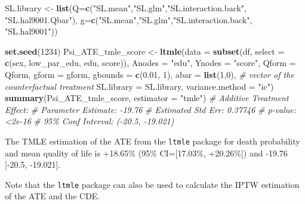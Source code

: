 \documentclass[
]{book}
\newenvironment{Shaded}{\begin{snugshade}}{\end{snugshade}}
\newcommand{\AttributeTok}[1]{\textcolor[rgb]{0.13,0.29,0.53}{#1}}
\newcommand{\CommentTok}[1]{\textcolor[rgb]{0.56,0.35,0.01}{\textit{#1}}}
\newcommand{\DecValTok}[1]{\textcolor[rgb]{0.00,0.00,0.81}{#1}}
\newcommand{\FloatTok}[1]{\textcolor[rgb]{0.00,0.00,0.81}{#1}}
\newcommand{\FunctionTok}[1]{\textcolor[rgb]{0.13,0.29,0.53}{\textbf{#1}}}
\newcommand{\NormalTok}[1]{#1}
\newcommand{\OtherTok}[1]{\textcolor[rgb]{0.56,0.35,0.01}{#1}}
\newcommand{\StringTok}[1]{\textcolor[rgb]{0.31,0.60,0.02}{#1}}
\begin{document}
\begin{Shaded}
\begin{Highlighting}[]
\NormalTok{SL.library }\OtherTok{\textless{}{-}} \FunctionTok{list}\NormalTok{(}\AttributeTok{Q=}\FunctionTok{c}\NormalTok{(}\StringTok{"SL.mean"}\NormalTok{,}\StringTok{"SL.glm"}\NormalTok{,}\StringTok{"SL.interaction.back"}\NormalTok{, }\StringTok{"SL.hal9001.Qbar"}\NormalTok{),}
                   \AttributeTok{g=}\FunctionTok{c}\NormalTok{(}\StringTok{"SL.mean"}\NormalTok{,}\StringTok{"SL.glm"}\NormalTok{,}\StringTok{"SL.interaction.back"}\NormalTok{, }\StringTok{"SL.hal9001"}\NormalTok{))}

\FunctionTok{set.seed}\NormalTok{(}\DecValTok{1234}\NormalTok{)}
\NormalTok{Psi\_ATE\_tmle\_score }\OtherTok{\textless{}{-}} \FunctionTok{ltmle}\NormalTok{(}\AttributeTok{data =} \FunctionTok{subset}\NormalTok{(df, }
                                          \AttributeTok{select =} \FunctionTok{c}\NormalTok{(sex, low\_par\_edu,}
\NormalTok{                                                     edu,}
\NormalTok{                                                     score)),}
                      \AttributeTok{Anodes =} \StringTok{"edu"}\NormalTok{,}
                      \AttributeTok{Ynodes =} \StringTok{"score"}\NormalTok{,}
                      \AttributeTok{Qform =}\NormalTok{ Qform,}
                      \AttributeTok{gform =}\NormalTok{ gform,}
                      \AttributeTok{gbounds =} \FunctionTok{c}\NormalTok{(}\FloatTok{0.01}\NormalTok{, }\DecValTok{1}\NormalTok{),}
                      \AttributeTok{abar =} \FunctionTok{list}\NormalTok{(}\DecValTok{1}\NormalTok{,}\DecValTok{0}\NormalTok{), }\CommentTok{\# vector of the counterfactual treatment }
                      \AttributeTok{SL.library =}\NormalTok{ SL.library,}
                      \AttributeTok{variance.method =} \StringTok{"ic"}\NormalTok{)}
\FunctionTok{summary}\NormalTok{(Psi\_ATE\_tmle\_score, }\AttributeTok{estimator =} \StringTok{"tmle"}\NormalTok{)}
\CommentTok{\# Additive Treatment Effect:}
\CommentTok{\#    Parameter Estimate:  {-}19.76 }
\CommentTok{\#     Estimated Std Err:  0.37746 }
\CommentTok{\#               p{-}value:  \textless{}2e{-}16 }
\CommentTok{\#     95\% Conf Interval: ({-}20.5, {-}19.021) }
\end{Highlighting}
\end{Shaded}

The TMLE estimation of the ATE from the \texttt{ltmle} package for death probability and mean quality of life is +18.65\% (95\% CI={[}17.03\%, +20.26\%{]}) and -19.76 {[}-20.5, -19.021{]}.

Note that the \texttt{ltmle} package can also be used to calculate the IPTW estimation of the ATE and the CDE.
\end{document}
